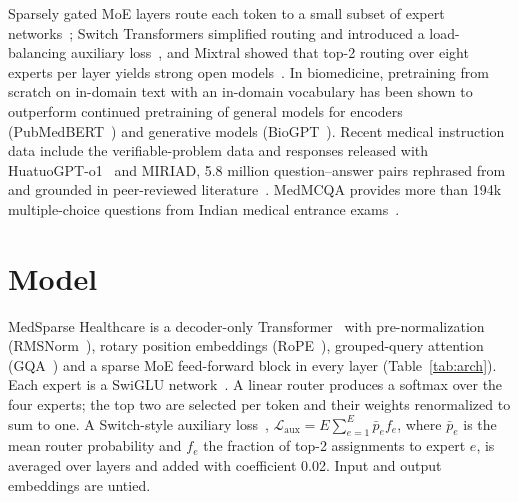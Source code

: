 \documentclass[11pt,a4paper]{article}
\begin{document}
Sparsely gated MoE layers route each token to a small subset of expert networks~\citep{shazeer2017outrageously}; Switch Transformers simplified routing and introduced a load-balancing auxiliary loss~\citep{fedus2022switch}, and Mixtral showed that top-2 routing over eight experts per layer yields strong open models~\citep{jiang2024mixtral}. In biomedicine, pretraining from scratch on in-domain text with an in-domain vocabulary has been shown to outperform continued pretraining of general models for encoders (PubMedBERT~\citep{gu2021pubmedbert}) and generative models (BioGPT~\citep{luo2022biogpt}). Recent medical instruction data include the verifiable-problem data and responses released with HuatuoGPT-o1~\citep{chen2025huatuogpto1} and MIRIAD, 5.8 million question--answer pairs rephrased from and grounded in peer-reviewed literature~\citep{zheng2025miriad}. MedMCQA provides more than 194k multiple-choice questions from Indian medical entrance exams~\citep{pal2022medmcqa}.

\section{Model}

MedSparse Healthcare is a decoder-only Transformer~\citep{vaswani2017attention} with pre-normalization (RMSNorm~\citep{zhang2019rmsnorm}), rotary position embeddings (RoPE~\citep{su2024roformer}), grouped-query attention (GQA~\citep{ainslie2023gqa}) and a sparse MoE feed-forward block in every layer (Table~\ref{tab:arch}). Each expert is a SwiGLU network~\citep{shazeer2020glu}. A linear router produces a softmax over the four experts; the top two are selected per token and their weights renormalized to sum to one. A Switch-style auxiliary loss~\citep{fedus2022switch}, $\mathcal{L}_{\text{aux}} = E \sum_{e=1}^{E} \bar{p}_e f_e$, where $\bar{p}_e$ is the mean router probability and $f_e$ the fraction of top-2 assignments to expert $e$, is averaged over layers and added with coefficient 0.02. Input and output embeddings are untied.
\end{document}

